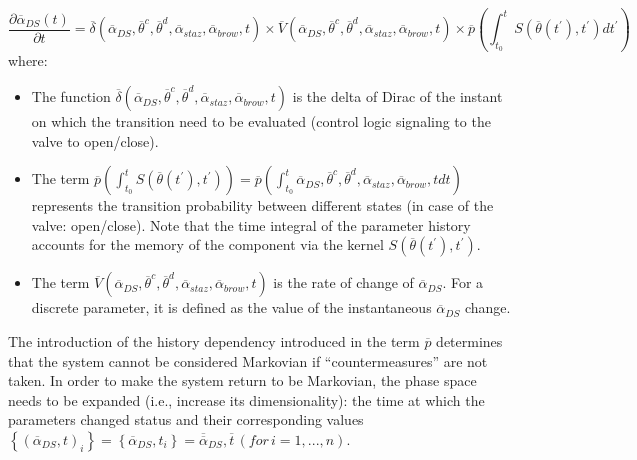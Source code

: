 \begin{equation}
\label{eq:systemDiscAndStochVaryVars}
\frac{\partial  \overline{\alpha }_{DS}\left ( t \right )}{\partial t}=  \overline{\delta}\left ( \overline{\alpha }_{DS}, \overline{\theta}^{c},\overline{\theta}^{d},\overline{\alpha}_{staz},\overline{\alpha}_{brow},t \right ) \times \overline{V}\left ( \overline{\alpha }_{DS}, \overline{\theta}^{c},\overline{\theta}^{d},\overline{\alpha}_{staz},\overline{\alpha}_{brow},t \right ) \times \overline{p}\left ( \int_{t_{0}}^{t}  S\left ( \overline{\theta}\left ( t^{'} \right ),t^{'} \right )dt^{'} \right )
\end{equation}
where:
\begin{itemize}
  \item The function $\overline{\delta}\left ( \overline{\alpha }_{DS}, \overline{\theta}^{c},\overline{\theta}^{d},
  \overline{\alpha}_{staz},\overline{\alpha}_{brow},t \right )$ is the delta of Dirac of the instant on which the 
  transition need to be evaluated (control logic signaling to the valve to open/close).
  \item The term $\overline{p}\left ( \int_{t_{0}}^{t}  S\left ( \overline{\theta}\left ( t^{'} \right ),t^{'} \right )\right ) 
  = \overline{p}\left ( \int_{t_{0}}^{t}  \overline{\alpha }_{DS}, \overline{\theta}^{c},\overline{\theta}^{d},
  \overline{\alpha}_{staz},\overline{\alpha}_{brow},t dt\right )$ represents the transition probability
  between different states (in case of the valve: open/close). Note that the time integral of the
  parameter history accounts for the memory of the component via the kernel $S\left ( \overline{\theta}\left ( t^{'} 
  \right ),t^{'} \right )$.
  \item The term $\overline{V}\left ( \overline{\alpha }_{DS}, \overline{\theta}^{c},\overline{\theta}^{d},
  \overline{\alpha}_{staz},\overline{\alpha}_{brow},t \right )$ is the rate of change of $\overline{\alpha }_{DS}$. 
  For a discrete parameter, it is defined as the value of the instantaneous $\overline{\alpha }_{DS}$ change.
\end{itemize}
The introduction of the history dependency introduced in the term $\overline{p}$ determines that the system cannot be considered 
Markovian if ``countermeasures'' are not taken. In order to make the system return to be Markovian, the phase space needs to be 
expanded (i.e., increase its dimensionality): the time at which the 
parameters changed status and their corresponding values $\left \{  \left (\overline{\alpha}_{DS}, t \right )_{i} \right \} = \left \{  \overline{\alpha}_{DS}, t_{i} \right \} = \overline{\overline{\alpha}}_{DS}, \overline{t}\, \left ( for\, i=1,...,n \right )$.
